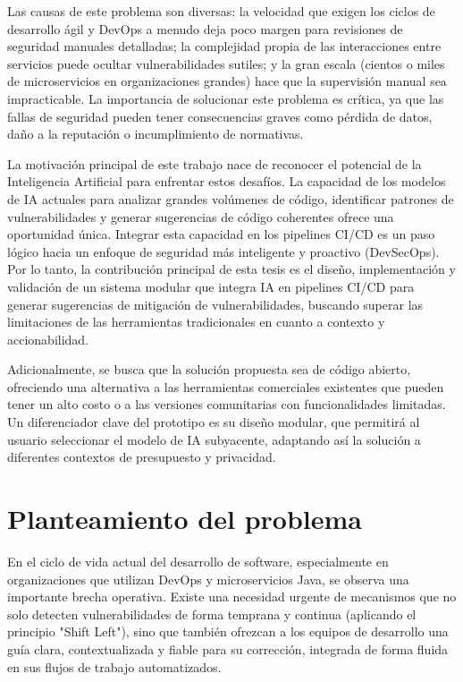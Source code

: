 Las causas de este problema son diversas: la velocidad que exigen los ciclos de desarrollo ágil y DevOps a menudo deja poco margen para revisiones de seguridad manuales detalladas; la complejidad propia de las interacciones entre servicios puede ocultar vulnerabilidades sutiles; y la gran escala (cientos o miles de microservicios en organizaciones grandes) hace que la supervisión manual sea impracticable. La importancia de solucionar este problema es crítica, ya que las fallas de seguridad pueden tener consecuencias graves como pérdida de datos, daño a la reputación o incumplimiento de normativas.

La motivación principal de este trabajo nace de reconocer el potencial de la Inteligencia Artificial para enfrentar estos desafíos. La capacidad de los modelos de IA actuales para analizar grandes volúmenes de código, identificar patrones de vulnerabilidades y generar sugerencias de código coherentes ofrece una oportunidad única. Integrar esta capacidad en los pipelines CI/CD es un paso lógico hacia un enfoque de seguridad más inteligente y proactivo (DevSecOps). Por lo tanto, la contribución principal de esta tesis es el diseño, implementación y validación de un sistema modular que integra IA en pipelines CI/CD para generar sugerencias de mitigación de vulnerabilidades, buscando superar las limitaciones de las herramientas tradicionales en cuanto a contexto y accionabilidad.

Adicionalmente, se busca que la solución propuesta sea de código abierto, ofreciendo una alternativa a las herramientas comerciales existentes que pueden tener un alto costo \cite{ghas_docs, sonarqube_editions} o a las versiones comunitarias con funcionalidades limitadas. Un diferenciador clave del prototipo es su diseño modular, que permitirá al usuario seleccionar el modelo de IA subyacente, adaptando así la solución a diferentes contextos de presupuesto y privacidad.

\section{Planteamiento del problema}\label{sec:planteamiento_problema}
En el ciclo de vida actual del desarrollo de software, especialmente en organizaciones que utilizan DevOps y microservicios Java, se observa una importante brecha operativa. Existe una necesidad urgente de mecanismos que no solo detecten vulnerabilidades de forma temprana y continua (aplicando el principio "Shift Left"), sino que también ofrezcan a los equipos de desarrollo una guía clara, contextualizada y fiable para su corrección, integrada de forma fluida en sus flujos de trabajo automatizados.


